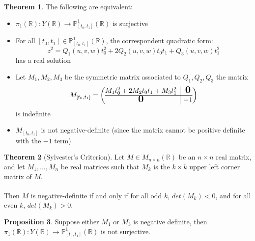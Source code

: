 \documentclass{article}
\newcommand{\bigzero}{\mbox{\normalfont\Large\bfseries 0}}
\newcommand{\Rbb}{\mathbb{R}}
\newcommand{\Pbb}{\mathbb{P}}
\begin{document}
\theoremstyle{definition}
\newtheorem{theorem}{Theorem}[section]
\theoremstyle{definition}
\newtheorem{conjecture}[theorem]{Conjecture}
\theoremstyle{definition}
\newtheorem{definition}[theorem]{Definition}
\theoremstyle{definition}
\newtheorem{goal}[theorem]{Goal}
\theoremstyle{definition}
\newtheorem{corollary}[theorem]{Corollary}
\theoremstyle{definition}
\newtheorem{question}[theorem]{Question}
\theoremstyle{definition}
\newtheorem{lemma}[theorem]{Lemma}
\theoremstyle{definition}
\newtheorem{proposition}[theorem]{Proposition}

\begin{theorem}
The following are equivalent:
\begin{itemize}
    \item $\pi_1(\Rbb): Y(\Rbb) \to \Pbb^{1}_{[t_0, t_1]}(\Rbb)$ is surjective
    \item For all $[t_0, t_1] \in \Pbb^{1}_{[t_0, t_1]}(\Rbb)$, the correspondent quadratic form:
    \[z^2 = Q_1(u, v, w)t_0^2 + 2Q_2(u, v, w)t_0 t_1 + Q_3(u, v, w) t_1^2\]
    has a real solution
    \item Let $M_1, M_2, M_3$ be the symmetric matrix associated to $Q_1, Q_2, Q_3$ the matrix 
    \[M_{[t_0, t_1]} = 
\left(\begin{array}{@{}c|c@{}}
  \begin{matrix}
    M_1t_0^2 + 2M_2t_0t_1 + M_3t_1^2
  \end{matrix}
  & \bigzero \\
\hline
  \bigzero &
  \begin{matrix}
  -1
  \end{matrix}
\end{array}\right)
\]
    is indefinite
    \item $M_{[t_0, t_1]}$ is not negative-definite (since the matrix cannot be positive definite with the $-1$ term)
\end{itemize}
\end{theorem}

\begin{theorem}[Sylvester's Criterion]
Let $M \in M_{n \times n}(\Rbb)$ be an $n \times n$ real matrix, and let $M_1, ..., M_n$ be real matrices such that $M_k$ is the $k \times k$ upper left corner matrix of $M$.\\\\
Then $M$ is negative-definite if and only if for all odd $k$, $det(M_k) < 0$, and for all even $k$, $det(M_k) > 0$.
\end{theorem}

\begin{proposition}
Suppose either $M_1$ or $M_3$ is negative definite, then $\pi_1(\Rbb): Y(\Rbb) \to \Pbb^{1}_{[t_0, t_1]}(\Rbb)$ is not surjective.
\end{proposition}
\end{document}
